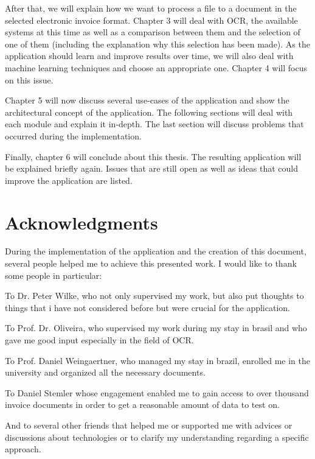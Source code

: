 After that, we will explain how we want to process a file to a document in the selected electronic invoice format. Chapter 3 will deal with OCR, the available systems at this time as well as a comparison between them and the selection of one of them (including the explanation why this selection has been made).
As the application should learn and improve results over time, we will also deal with machine learning techniques and choose an appropriate one. Chapter 4 will focus on this issue.

Chapter 5 will now discuss several use-cases of the application and show the architectural concept of the application. The following sections will deal with each module and explain it in-depth. The last section will discuss problems that occurred during the implementation.


Finally, chapter 6 will conclude about this thesis. The resulting application will be explained briefly again. Issues that are still open as well as ideas that could improve the application are listed.

\section{Acknowledgments}
\label{sec1.7}

During the implementation of the application and the creation of this document, several people helped me to achieve this presented work. I would like to thank some people in particular:

To Dr. Peter Wilke, who not only supervised my work, but also put thoughts to things that i have not considered before but were crucial for the application.

To Prof. Dr. Oliveira, who supervised my work during my stay in brasil and who gave me good input especially in the field of OCR.

To Prof. Daniel Weingaertner, who managed my stay in brazil, enrolled me in the university and organized all the necessary documents.

To Daniel Stemler whose engagement enabled me to gain access to over thousand invoice documents in order to get a reasonable amount of data to test on.

And to several other friends that helped me or supported me with advices or discussions about technologies or to clarify my understanding regarding a specific approach.